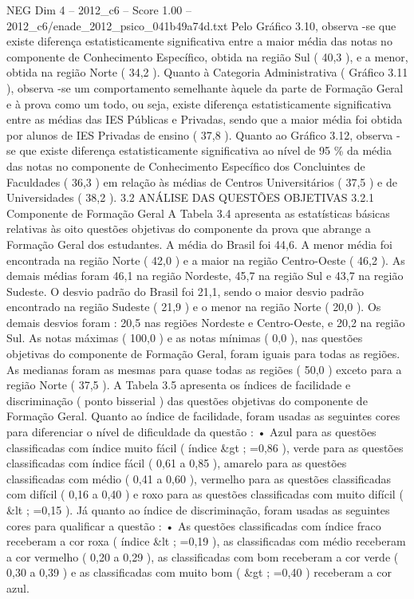 \begin{textsample}{NEG Dim 4 – 2012\_c6 – Score 1.00 – 2012\_c6/enade\_2012\_psico\_041b49a74d.txt}
Pelo Gráfico 3.10, observa -se que existe diferença estatisticamente significativa entre a maior média das notas no componente de Conhecimento Específico, obtida na região Sul ( 40,3 ), e a menor, obtida na região Norte ( 34,2 ).
Quanto à Categoria Administrativa ( Gráfico 3.11 ), observa -se um comportamento semelhante àquele da parte de Formação Geral e à prova como um todo, ou seja, existe diferença estatisticamente significativa entre as médias das IES Públicas e Privadas, sendo que a maior média foi obtida por alunos de IES Privadas de ensino ( 37,8 ).
Quanto ao Gráfico 3.12, observa -se que existe diferença estatisticamente significativa ao nível de 95 \% da média das notas no componente de Conhecimento Específico dos Concluintes de Faculdades ( 36,3 ) em relação às médias de Centros Universitários ( 37,5 ) e de Universidades ( 38,2 ). 3.2 ANÁLISE DAS QUESTÕES OBJETIVAS 3.2.1 Componente de Formação Geral A Tabela 3.4 apresenta as estatísticas básicas relativas às oito questões objetivas do componente da prova que abrange a Formação Geral dos estudantes.
A média do Brasil foi 44,6.
A menor média foi encontrada na região Norte ( 42,0 ) e a maior na região Centro-Oeste ( 46,2 ).
As demais médias foram 46,1 na região Nordeste, 45,7 na região Sul e 43,7 na região Sudeste.
O desvio padrão do Brasil foi 21,1, sendo o maior desvio padrão encontrado na região Sudeste ( 21,9 ) e o menor na região Norte ( 20,0 ).
Os demais desvios foram : 20,5 nas regiões Nordeste e Centro-Oeste, e 20,2 na região Sul.
As notas máximas ( 100,0 ) e as notas mínimas ( 0,0 ), nas questões objetivas do componente de Formação Geral, foram iguais para todas as regiões.
As medianas foram as mesmas para quase todas as regiões ( 50,0 ) exceto para a região Norte ( 37,5 ).
A Tabela 3.5 apresenta os índices de facilidade e discriminação ( ponto bisserial ) das questões objetivas do componente de Formação Geral.
Quanto ao índice de facilidade, foram usadas as seguintes cores para diferenciar o nível de dificuldade da questão : • Azul para as questões classificadas com índice muito fácil ( índice \&gt ; =0,86 ), verde para as questões classificadas com índice fácil ( 0,61 a 0,85 ), amarelo para as questões classificadas com médio ( 0,41 a 0,60 ), vermelho para as questões classificadas com difícil ( 0,16 a 0,40 ) e roxo para as questões classificadas com muito difícil ( \&lt ; =0,15 ).
Já quanto ao índice de discriminação, foram usadas as seguintes cores para qualificar a questão : • As questões classificadas com índice fraco receberam a cor roxa ( índice \&lt ; =0,19 ), as classificadas com médio receberam a cor vermelho ( 0,20 a 0,29 ), as classificadas com bom receberam a cor verde ( 0,30 a 0,39 ) e as classificadas com muito bom ( \&gt ; =0,40 ) receberam a cor azul.

\end{textsample}
